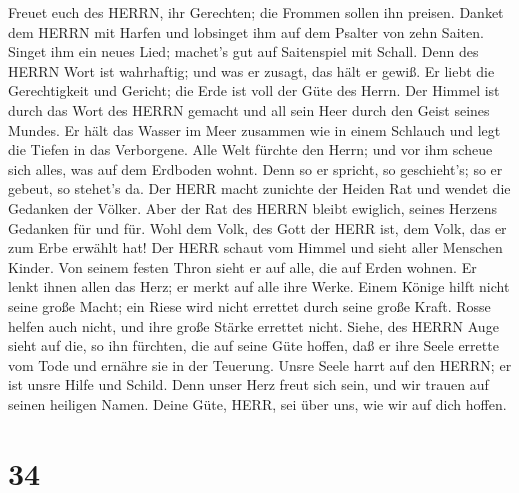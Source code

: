  Freuet euch des HERRN, ihr Gerechten; die Frommen sollen
ihn preisen.  Danket dem HERRN mit Harfen und lobsinget ihm
auf dem Psalter von zehn Saiten.  Singet ihm ein neues Lied;
machet's gut auf Saitenspiel mit Schall.  Denn des HERRN
Wort ist wahrhaftig; und was er zusagt, das hält er gewiß. 
Er liebt die Gerechtigkeit und Gericht; die Erde ist voll der Güte des
Herrn.  Der Himmel ist durch das Wort des HERRN gemacht und
all sein Heer durch den Geist seines Mundes.  Er hält das
Wasser im Meer zusammen wie in einem Schlauch und legt die Tiefen in das
Verborgene.  Alle Welt fürchte den Herrn; und vor ihm scheue
sich alles, was auf dem Erdboden wohnt.  Denn so er spricht,
so geschieht's; so er gebeut, so stehet's da.  Der HERR
macht zunichte der Heiden Rat und wendet die Gedanken der Völker.
 Aber der Rat des HERRN bleibt ewiglich, seines Herzens
Gedanken für und für.  Wohl dem Volk, des Gott der HERR
ist, dem Volk, das er zum Erbe erwählt hat!  Der HERR
schaut vom Himmel und sieht aller Menschen Kinder.  Von
seinem festen Thron sieht er auf alle, die auf Erden wohnen.
 Er lenkt ihnen allen das Herz; er merkt auf alle ihre
Werke.  Einem Könige hilft nicht seine große Macht; ein
Riese wird nicht errettet durch seine große Kraft.  Rosse
helfen auch nicht, und ihre große Stärke errettet nicht. 
Siehe, des HERRN Auge sieht auf die, so ihn fürchten, die auf seine Güte
hoffen,  daß er ihre Seele errette vom Tode und ernähre sie
in der Teuerung.  Unsre Seele harrt auf den HERRN; er ist
unsre Hilfe und Schild.  Denn unser Herz freut sich sein,
und wir trauen auf seinen heiligen Namen.  Deine Güte,
HERR, sei über uns, wie wir auf dich hoffen.

\hypertarget{section-33}{%
\section{34}\label{section-33}}

